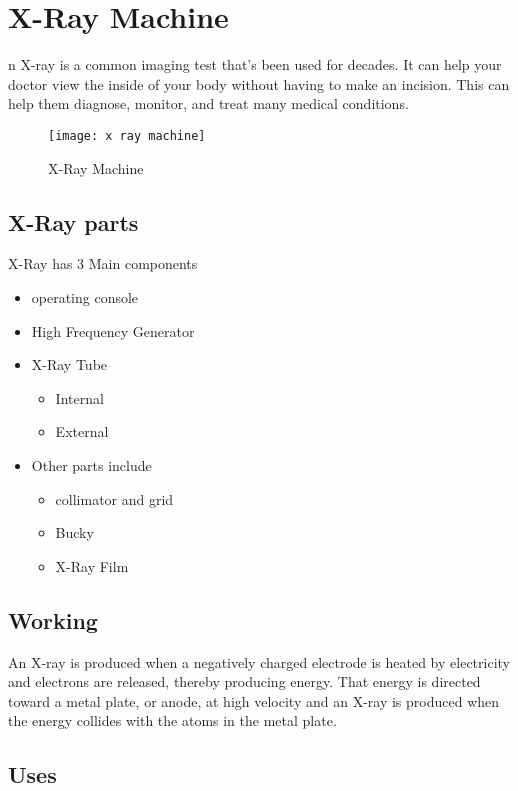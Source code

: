 \documentclass[12pt]{article}
\begin{document}
\tableofcontents


\section{X-Ray Machine}


n X-ray is a common imaging test that’s been used for decades. It can help your doctor view the inside of your body without having to make an incision. This can help them diagnose, monitor, and treat many medical conditions.

\begin{figure}
\centering
\texttt{[image: x ray machine]}
\caption{X-Ray Machine}
\end{figure}

\subsection{X-Ray parts}
X-Ray has 3 Main components
\begin{itemize}
\item operating console
\item High Frequency Generator
\item X-Ray Tube
\begin{itemize}
\item Internal
\item External
\end{itemize}
\item Other parts include
\begin{itemize}
\item collimator and grid
\item Bucky
\item X-Ray Film
\end{itemize}
\end{itemize}

\subsection{Working}

An X-ray is produced when a negatively charged electrode is heated by electricity and electrons are released, thereby producing energy. That energy is directed toward a metal plate, or anode, at high velocity and an X-ray is produced when the energy collides with the atoms in the metal plate.

\subsection{Uses}
\end{document}
